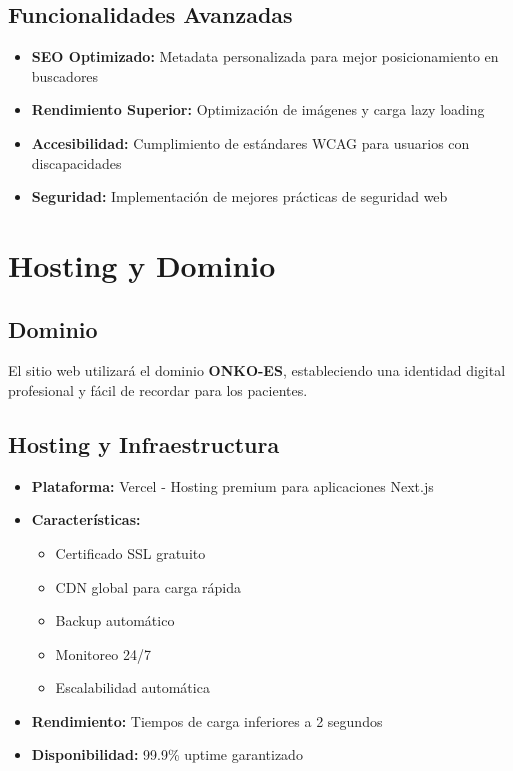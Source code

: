 \documentclass[12pt,a4paper]{article}
\begin{document}
\subsection{Funcionalidades Avanzadas}

\begin{itemize}[leftmargin=*]
    \item \textbf{SEO Optimizado:} Metadata personalizada para mejor posicionamiento en buscadores
    \item \textbf{Rendimiento Superior:} Optimización de imágenes y carga lazy loading
    \item \textbf{Accesibilidad:} Cumplimiento de estándares WCAG para usuarios con discapacidades
    \item \textbf{Seguridad:} Implementación de mejores prácticas de seguridad web
\end{itemize}

\section{Hosting y Dominio}

\subsection{Dominio}
El sitio web utilizará el dominio \textbf{ONKO-ES}, estableciendo una identidad digital profesional y fácil de recordar para los pacientes.

\subsection{Hosting y Infraestructura}
\begin{itemize}
    \item \textbf{Plataforma:} Vercel - Hosting premium para aplicaciones Next.js
    \item \textbf{Características:}
    \begin{itemize}
        \item Certificado SSL gratuito
        \item CDN global para carga rápida
        \item Backup automático
        \item Monitoreo 24/7
        \item Escalabilidad automática
    \end{itemize}
    \item \textbf{Rendimiento:} Tiempos de carga inferiores a 2 segundos
    \item \textbf{Disponibilidad:} 99.9\% uptime garantizado
\end{itemize}
\end{document}
